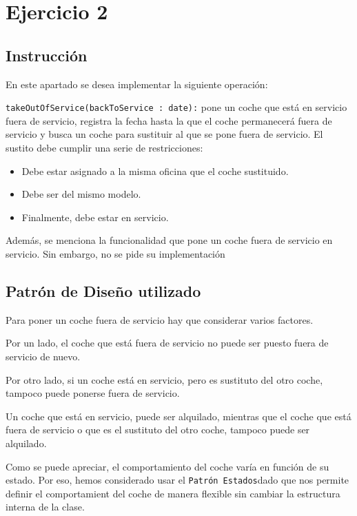 \section{Ejercicio 2}
\subsection*{Instrucción}
En este apartado se desea implementar la siguiente operación:
\par
\vspace{0.15cm}
\texttt{takeOutOfService(backToService : date):} 
pone un coche que está en servicio fuera de servicio, registra la fecha hasta la que el coche permanecerá fuera de servicio y busca un coche para sustituir al que se pone fuera de servicio. El sustito debe cumplir
una serie de restricciones: 

\begin{itemize}
    \item Debe estar asignado a la misma oficina que el coche sustituido.
    \item Debe ser del mismo modelo.
    \item Finalmente, debe estar en servicio.
\end{itemize}

Además, se menciona la funcionalidad que pone un coche fuera de servicio en servicio. Sin embargo, no se pide su implementación


\subsection{Patrón de Diseño utilizado}

Para poner un coche fuera de servicio hay que considerar varios factores.

Por un lado, el coche que está fuera de servicio no puede ser puesto fuera 
de servicio de nuevo. 

Por otro lado, si un coche está en servicio, pero es sustituto del otro coche, 
tampoco puede ponerse fuera de servicio.

Un coche que está en servicio, puede ser alquilado, mientras que el coche que está fuera de servicio 
o que es el sustituto del otro coche, tampoco puede ser alquilado.

Como se puede apreciar, el comportamiento del coche varía en función de su estado. Por eso, hemos considerado usar el \texttt{Patrón Estados}dado que nos permite definir el comportamient del coche de manera flexible sin cambiar la estructura interna de la clase.

